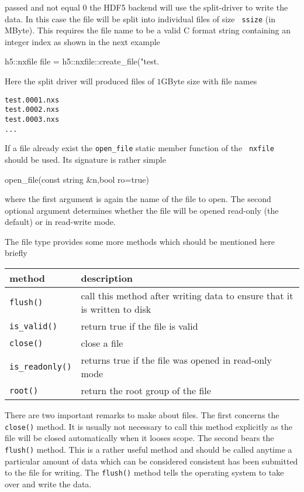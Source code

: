 passed and not equal $0$ the HDF5 backend will use the split-driver to write the
data. In this case the file will be split into individual files of size {\tt
ssize} (in MByte). This requires the file name to be a valid C format string
containing an integer index as shown in the next example
\begin{cppcode}
h5::nxfile file = h5::nxfile::create_file("test.%
\end{cppcode}
Here the split driver will produced files of $1$GByte size with file names
\begin{verbatim}
test.0001.nxs
test.0002.nxs
test.0003.nxs
...
\end{verbatim}
If a file already exist the {\tt open\_file} static member function of the {\tt
nxfile} should be used. 
Its signature is rather simple 
\begin{cppcode}
open_file(const string &n,bool ro=true)
\end{cppcode}
where the first argument is again the name of the file to open. The second
optional argument determines whether the file will be opened read-only (the
default) or in read-write mode. 

The file type provides some more methods which should be mentioned here briefly 
\begin{center}
\begin{tabular}{l|l}
method & description\\
\hline\hline
{\tt flush()} & call this method after writing data to ensure that it is written
to disk \\
\hline
{\tt is\_valid()} & return true if the file is valid \\
\hline
{\tt close()} & close a file \\
\hline
{\tt is\_readonly()} & returns true if the file was opened in read-only mode \\
\hline
{\tt root()} & return the root group of the file \\
\hline
\end{tabular}
\end{center}
There are two important remarks to make about files. The first concerns the {\tt
close()} method. It is usually not necessary to call this method explicitly as
the file will be closed automatically when it looses scope. 
The second bears the {\tt flush()} method. This is a rather useful method and
should be called anytime a particular amount of data which can be considered
consistent has been submitted to the file for writing. The {\tt flush()} method 
tells the operating system to take over and write the data.


